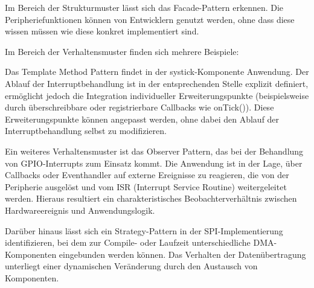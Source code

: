 Im Bereich der Strukturmuster lässt sich das Facade-Pattern erkennen.
Die Peripheriefunktionen können von Entwicklern genutzt werden, ohne dass diese wissen müssen wie diese konkret implementiert sind.

Im Bereich der Verhaltensmuster finden sich mehrere Beispiele:

Das Template Method Pattern findet in der systick-Komponente Anwendung. 
Der Ablauf der Interruptbehandlung ist in der entsprechenden Stelle explizit definiert, ermöglicht jedoch die Integration individueller Erweiterungspunkte (beispielsweise durch überschreibbare oder registrierbare Callbacks wie onTick()). 
Diese Erweiterungspunkte können angepasst werden, ohne dabei den Ablauf der Interruptbehandlung selbst zu modifizieren.

Ein weiteres Verhaltensmuster ist das Observer Pattern, das bei der Behandlung von GPIO-Interrupts zum Einsatz kommt.
Die Anwendung ist in der Lage, über Callbacks oder Eventhandler auf externe Ereignisse zu reagieren, die von der Peripherie ausgelöst und vom ISR (Interrupt Service Routine) weitergeleitet werden. 
Hieraus resultiert ein charakteristisches Beobachterverhältnis zwischen Hardwareereignis und Anwendungslogik.

Darüber hinaus lässt sich ein Strategy-Pattern in der SPI-Implementierung identifizieren, bei dem zur Compile- oder Laufzeit unterschiedliche DMA-Komponenten eingebunden werden können. 
Das Verhalten der Datenübertragung unterliegt einer dynamischen Veränderung durch den Austausch von Komponenten.
